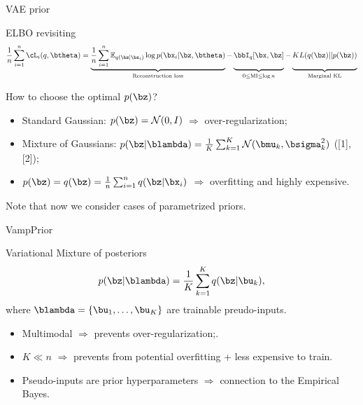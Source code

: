 \begin{frame}{VAE prior}
	\vspace{-0.5cm}
	\begin{block}{ELBO revisiting}
	\vspace{-0.5cm}
	{\footnotesize
	\[
 		 \frac{1}{n} \sum_{i=1}^n \cL_i(q, \btheta) = \underbrace{\frac{1}{n} \sum_{i=1}^n \mathbb{E}_{q(\bz | \bx_i)} \log p(\bx_i | \bz, \btheta)}_{\text{Reconstruction loss}}
		  - \underbrace{\vphantom{ \sum_{i=1}^n} \bbI_q [\bx, \bz]}_{0 \leq \text{MI} \leq \log n } - \underbrace{\vphantom{ \sum_{i=1}^n} KL(q(\bz) || p(\bz))}_{\text{Marginal KL}}
	\]
		}
	\end{block}
	\vspace{-0.4cm}
	
	How to choose the optimal $p(\bz)$?
	\begin{itemize}
	    \item Standard Gaussian: $p(\bz) = \mathcal{N}(0, I)$ $\Rightarrow$ over-regularization;
	    \vspace{0.1cm}
	    \item Mixture of Gaussians: $p(\bz | \blambda) = \frac{1}{K} \sum_{k=1}^K \mathcal{N}(\bmu_k, \bsigma_k^2)$ ([1], [2]);
	    \item $p(\bz) = q(\bz) = \frac{1}{n}\sum_{i=1}^n q(\bz | \bx_i)$ $\Rightarrow$ overfitting and highly expensive.
	\end{itemize}
	Note that now we consider cases of parametrized priors.


\end{frame}
\begin{frame}{VampPrior}
	\begin{block}{Variational Mixture of posteriors}
		\[
		p(\bz | \blambda) = \frac{1}{K} \sum_{k=1}^K q(\bz | \bu_k),
		\]
		where $\blambda = \{\bu_1, \dots, \bu_K\}$ are trainable preudo-inputs.
	\end{block}
	\begin{itemize}
		\item Multimodal $\Rightarrow$ prevents over-regularization;.
		\item $K \ll n$ $\Rightarrow$ prevents from potential overfitting + less expensive to train.
		\item Pseudo-inputs are prior hyperparameters $\Rightarrow$ connection to the Empirical Bayes.
	\end{itemize}
\end{frame}

